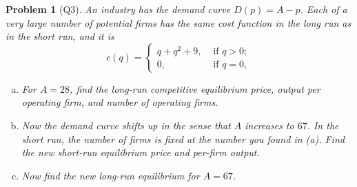 \documentclass{article}
\newtheorem*{prob}{{\bf Problem}}
\newcommand{\1}{{\bf 1}}
\newcommand{\0}{{\mathbf{0}}}
\newcommand{\<}{\langle}
\renewcommand{\>}{\rangle}
\begin{document}
\begin{prob}[Q3]
	An industry has the demand curve $D(p) = A- p$. Each of a very large number of potential firms has the same cost function in the long run as in the short run, and it is
\begin{equation} c(q) = \left\{ \begin{array}{cc} q+q^2 +9, & \text{ if }q >0; \\ 0, & \text{ if } q=0,
\end{array} \right.
\end{equation}
\begin{enumerate}[(a)]
	\item For $A = 28$, find the long-run competitive equilibrium price, output per operating firm, and number of operating firms.
	\item Now the demand curve shifts up in the sense that $A$ increases to $67$. In the short run, the number of firms is fixed at the number you found in (a). Find the new short-run equilibrium price and per-firm output.
	\item Now find the new long-run equilibrium for $A = 67$.
\end{enumerate}

\end{prob}
\end{document}

